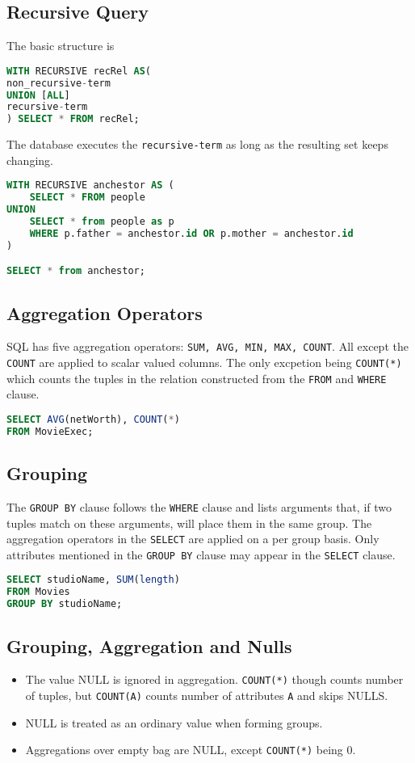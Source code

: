 \documentclass{sciposter}
\renewcommand{\t}[1]{\texttt{#1}}
\begin{document}
\begin{multicols}{3}
\subsection*{Recursive Query}
The basic structure is 
\begin{lstlisting}[language=SQL]
WITH RECURSIVE recRel AS(
non_recursive-term
UNION [ALL]
recursive-term
) SELECT * FROM recRel;
\end{lstlisting}
The database executes the \t{recursive-term} as long as the resulting set keeps changing.
\begin{lstlisting}[language=SQL]
WITH RECURSIVE anchestor AS (
	SELECT * FROM people
UNION
	SELECT * from people as p
	WHERE p.father = anchestor.id OR p.mother = anchestor.id
)

SELECT * from anchestor;
\end{lstlisting}

\subsection*{Aggregation Operators}

SQL has five aggregation operators: \texttt{SUM, AVG, MIN, MAX, COUNT}. All except the \t{COUNT} are applied to scalar valued columns. The only excpetion being \t{COUNT(*)} which counts the tuples in the relation constructed from the \t{FROM} and \t{WHERE} clause.

\begin{lstlisting}[language=SQL]
SELECT AVG(netWorth), COUNT(*) 
FROM MovieExec;
\end{lstlisting}


\subsection*{Grouping}
The \t{GROUP BY} clause follows the \t{WHERE} clause and lists arguments that, if two tuples match on these arguments, will place them in the same group. The aggregation operators in the \t{SELECT} are applied on a per group basis. Only attributes mentioned in the \t{GROUP BY} clause may appear in the \t{SELECT} clause.

\begin{lstlisting}[language=SQL]
SELECT studioName, SUM(length)
FROM Movies
GROUP BY studioName;
\end{lstlisting}

\subsection*{Grouping, Aggregation and Nulls}
\begin{itemize}
	\item The value NULL is ignored in aggregation. \t{COUNT(*)} though counts number of tuples, but \t{COUNT(A)} counts number of attributes \t{A} and skips NULLS.
	\item NULL is treated as an ordinary value when forming groups.
	\item Aggregations over empty bag are NULL, except \t{COUNT(*)} being 0.
\end{itemize}



\end{multicols}
\end{document}
